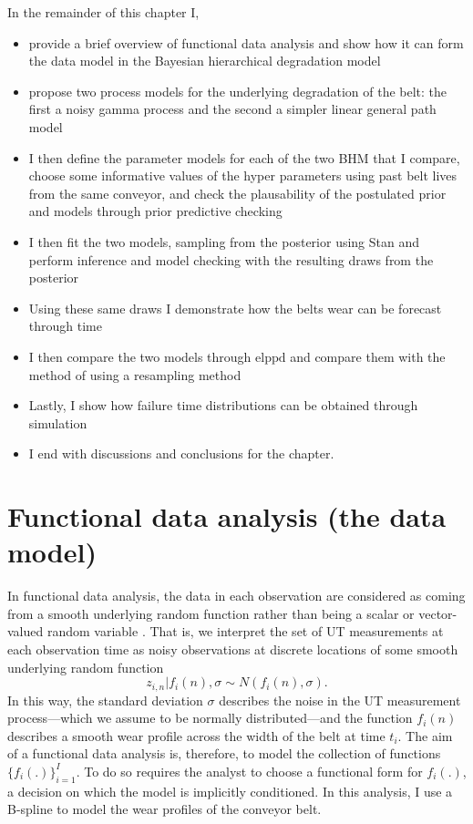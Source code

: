 In the remainder of this chapter I,
\begin{itemize}
  \item provide a brief overview of functional data analysis and show how it can form the data model in the Bayesian hierarchical degradation model
  \item propose two process models for the underlying degradation of the belt: the first a noisy gamma process and the second a simpler linear general path model
  \item I then define the parameter models for each of the two BHM that I compare, choose some informative values of the hyper parameters using past belt lives from the same conveyor, and check the plausability of the postulated prior and models through prior predictive checking
  \item I then fit the two models, sampling from the posterior using Stan and perform inference and model checking with the resulting draws from the posterior
  \item Using these same draws I demonstrate how the belts wear can be forecast through time
  \item I then compare the two models through $\mbox{elppd}$ and compare them with the method of \citet{webb_2020} using a resampling method
  \item Lastly, I show how failure time distributions can be obtained through simulation
  \item I end with discussions and conclusions for the chapter.
\end{itemize}

\section{Functional data analysis (the data model)}
In functional data analysis, the data in each observation are considered as coming from a smooth underlying random function rather than being a scalar or vector-valued random variable \citep[p. 512]{BDA2020}. That is, we interpret the set of UT measurements at each observation time as noisy observations at discrete locations of some smooth underlying random function
\begin{equation}
  z_{i, n}|f_i(n),\sigma \sim N(f_i(n), \sigma).
  \label{eq:fda}
\end{equation}
In this way, the standard deviation $\sigma$ describes the noise in the UT measurement process---which we assume to be normally distributed---and the function $f_i(n)$ describes a smooth wear profile across the width of the belt at time $t_i$. The aim of a functional data analysis is, therefore, to model the collection of functions $\{f_i(.)\}^I_{i = 1}$. To do so requires the analyst to choose a functional form for $f_i(.)$, a decision on which the model is implicitly conditioned. In this analysis, I use a B-spline to model the wear profiles of the conveyor belt.

